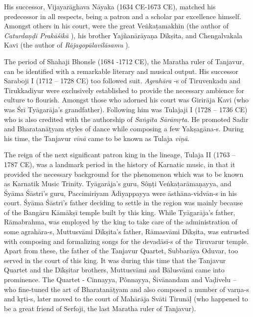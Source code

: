 His successor, Vijayarāghava Nāyaka (1634 CE-1673 CE), matched his predecessor in all respects, being a patron and a scholar par excellence himself. Amongst others in his court, were the great Veṅkaṭamakhin (the author of \textit{Caturdaṇḍi Prakāśikā} ), his brother Yajñanārāyaṇa Dīkṣita, and Chengalvakala Kavi (the author of \textit{Rājagopālavilāsamu} ).

The period of Shahaji Bhonsle (1684 -1712 CE), the Maratha ruler of Tanjavur, can be identified with a remarkable literary and musical output. His successor Saraboji I (1712 – 1728 CE) too followed suit. \textit{Agrahāra} -s of Tiruvenkadu and Tirukkadiyur were exclusively established to provide the necessary ambience for culture to flourish. Amongst those who adorned his court was Girirāja Kavi (who was Śrī Tyāgarāja’s grandfather). Following him was Tulajaji I (1728 – 1736 CE) who is also credited with the authorship of \textit{Saṅgīta Sārāmṛta}. He promoted Sadir and Bharatanāṭyam styles of dance while composing a few Yakṣagāna-s. During his time, the Tanjavur \textit{vīnā} came to be known as Tulaja \textit{vīṇā}.

The reign of the next significant patron king in the lineage, Tulaja II (1763 – 1787 CE), was a landmark period in the history of Karnatic music, in that it provided the necessary background for the phenomenon which was to be known as Karnatik Music Trinity. Tyāgarāja’s guru, Sôṇṭi Veṅkaṭarāmaṇayya, and Śyāma Śāstri’s guru, Paccimiriyam Ādiyappayya were āsthāna-vidvān-s in his court. Śyāma Śāstri’s father deciding to settle in the region was mainly because of the Bangāru Kāmākṣī temple built by this king. While Tyāgarāja’s father, Rāmabrahma, was employed by the king to take care of the administration of some agrahāra-s, Muttusvāmi Dīkṣita’s father, Rāmasvāmi Dīkṣita, was entrusted with composing and formalizing songs for the devadāsī-s of the Tiruvarur temple. Apart from these, the father of the Tanjavur Quartet, Subbarāya Oduvar, too served in the court of this king. It was during this time that the Tanjavur Quartet and the Dīkṣitar brothers, Muttusvāmi and Bālusvāmi came into prominence. The Quartet - Cinnayya, Pônnayya, Śivānandam and Vaḍivelu – who fine-tuned the art of Bharatanāṭyam and also composed a number of varṇa-s and kṛti-s, later moved to the court of Mahārāja Svāti Tirunāḷ (who happened to be a great friend of Serfoji, the last Maratha ruler of Tanjavur).


